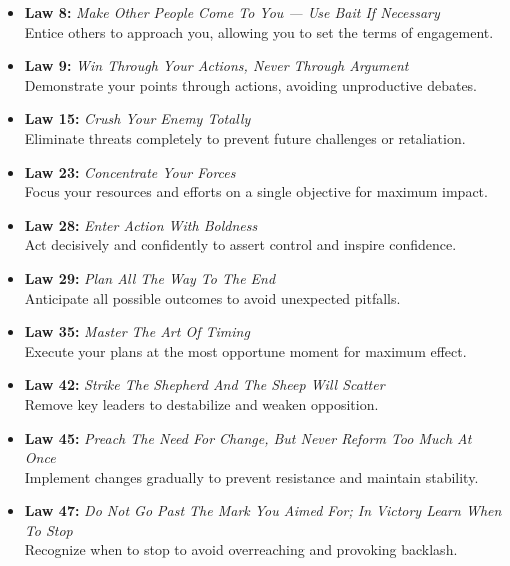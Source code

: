 \documentclass[a4paper,10.8pt]{article}
\begin{document}
\begin{itemize}[leftmargin=*, label={--}]
    \item \textbf{Law 8:} \textit{Make Other People Come To You — Use Bait If Necessary} \\
    Entice others to approach you, allowing you to set the terms of engagement.
    
    \item \textbf{Law 9:} \textit{Win Through Your Actions, Never Through Argument} \\
    Demonstrate your points through actions, avoiding unproductive debates.
    
    \item \textbf{Law 15:} \textit{Crush Your Enemy Totally} \\
    Eliminate threats completely to prevent future challenges or retaliation.
    
    \item \textbf{Law 23:} \textit{Concentrate Your Forces} \\
    Focus your resources and efforts on a single objective for maximum impact.
    
    \item \textbf{Law 28:} \textit{Enter Action With Boldness} \\
    Act decisively and confidently to assert control and inspire confidence.
    
    \item \textbf{Law 29:} \textit{Plan All The Way To The End} \\
    Anticipate all possible outcomes to avoid unexpected pitfalls.
    
    \item \textbf{Law 35:} \textit{Master The Art Of Timing} \\
    Execute your plans at the most opportune moment for maximum effect.
    
    \item \textbf{Law 42:} \textit{Strike The Shepherd And The Sheep Will Scatter} \\
    Remove key leaders to destabilize and weaken opposition.
    
    \item \textbf{Law 45:} \textit{Preach The Need For Change, But Never Reform Too Much At Once} \\
    Implement changes gradually to prevent resistance and maintain stability.
    
    \item \textbf{Law 47:} \textit{Do Not Go Past The Mark You Aimed For; In Victory Learn When To Stop} \\
    Recognize when to stop to avoid overreaching and provoking backlash.
\end{itemize}
\end{document}

